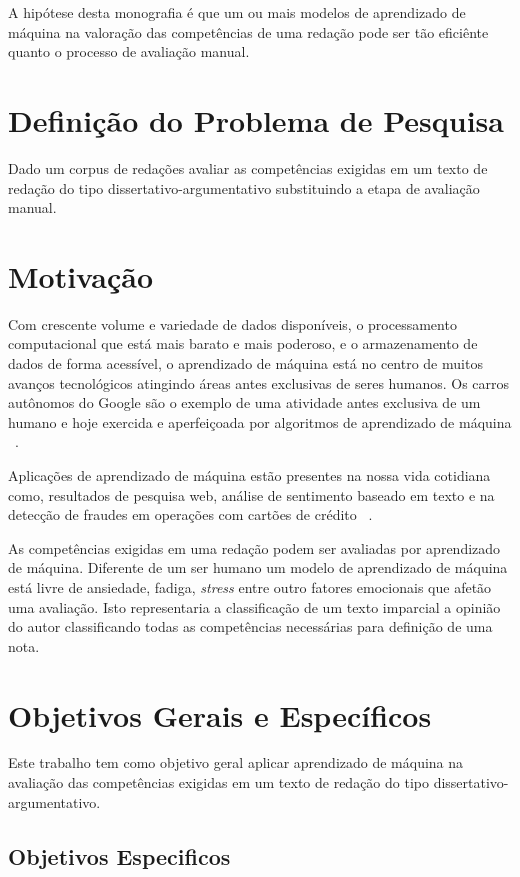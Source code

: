 A hipótese desta monografia é que um ou mais modelos de aprendizado de máquina na valoração das competências de uma redação pode ser tão eficiênte quanto o processo de avaliação manual.

\section{Definição do Problema de Pesquisa}

Dado um corpus de redações avaliar as competências exigidas em um texto de redação do tipo dissertativo-argumentativo substituindo a etapa de avaliação manual.

\section{Motivação}

Com crescente volume e variedade de dados disponíveis, o processamento computacional que está mais barato e mais poderoso, e o armazenamento de dados de forma acessível, o aprendizado de máquina está no centro de muitos avanços tecnológicos atingindo áreas antes exclusivas de seres humanos. Os carros autônomos do Google são o exemplo de uma atividade antes exclusiva de um humano e hoje exercida e aperfeiçoada por algoritmos de aprendizado de máquina ~\cite{waymo:2017}.

Aplicações de aprendizado de máquina estão presentes na nossa vida cotidiana como, resultados de pesquisa web, análise de sentimento baseado em texto e na detecção de fraudes em operações com cartões de crédito ~\cite{batista1999aplicando}.

As competências exigidas em uma redação podem ser avaliadas por aprendizado de máquina. Diferente de um ser humano um modelo de aprendizado de máquina está livre de ansiedade, fadiga, \textit{stress} entre outro fatores emocionais que afetão uma avaliação. Isto representaria a classificação de um texto imparcial a opinião do autor classificando todas as competências necessárias para definição de uma nota.

\section{Objetivos Gerais e Específicos}

Este trabalho tem como objetivo geral aplicar aprendizado de máquina na avaliação das competências exigidas em um texto de redação do tipo dissertativo-argumentativo.

\subsection{Objetivos Especificos}

